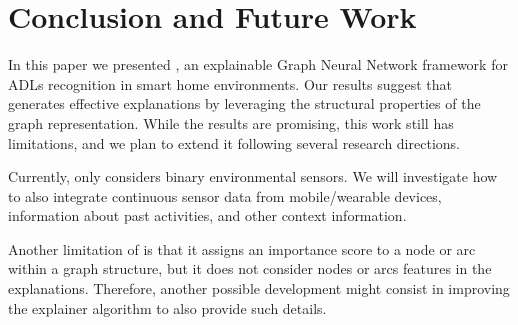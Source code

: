 \section{Conclusion and Future Work}

In this paper we presented \acronym{}, an explainable Graph Neural Network framework for ADLs recognition in smart home environments.
Our results suggest that \acronym{} generates effective explanations by leveraging the structural properties of the graph representation.
While the results are promising, this work still has limitations, and we plan to extend it following several research directions.







Currently, \acronym{} only considers binary environmental sensors. We will investigate how to also integrate continuous sensor data from mobile/wearable devices, information about past activities, and other context information.

Another limitation of \acronym{} is that it assigns an importance score to a node or arc within a graph structure, but it does not consider nodes or arcs features in the explanations. Therefore, another possible development might consist in improving the explainer algorithm to also provide such details.


